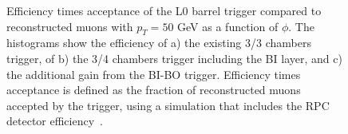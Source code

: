 \begin{figure}[h]
	\centering
\end{figure}	

\begin{figure}
	\centering	
	\caption{Efficiency times acceptance of the L0 barrel trigger compared to reconstructed muons with $p_{T} = 50$ GeV as a function of $\phi$. The histograms show the efficiency of a) the existing 3/3 chambers trigger, of b) the 3/4 chambers trigger including the BI layer, and c) the additional gain from the BI-BO trigger. Efficiency times acceptance is defined as the fraction of reconstructed muons accepted by the trigger, using a simulation that includes the RPC detector efficiency~\cite{Marcoccia:2693982}.}
\end{figure}	


\clearpage
